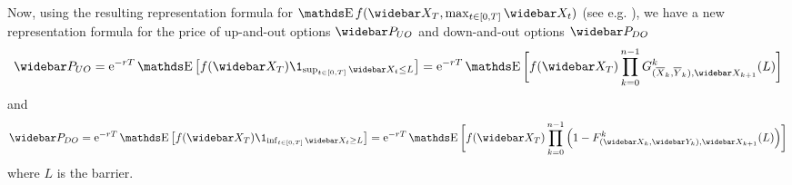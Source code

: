 Now, using the resulting representation formula for $\E f (\widebar X_T, \max_{t \in [0,T]} \widebar X_t)$ (see e.g. \cite{sagna2010pricing, pages2018numerical}), we have a new representation formula for the price of up-and-out options $\widebar P_{UO}$ and down-and-out options $\widebar P_{DO}$
\begin{equation}
	\widebar P_{UO} = \e^{-rT} \E \big[ f(\widebar X_T) \1_{\sup_{t \in [0,T]} \widebar X_t \leq L} \big] = \e^{-rT} \E \bigg[ f(\widebar X_T) \prod_{k=0}^{n-1} G_{ (\overline{X}_k, \overline{Y}_k), \widebar X_{k+1}}^k (L) \bigg]
\end{equation}
and
\begin{equation}
	\widebar P_{DO} = \e^{-rT} \E \big[ f(\widebar X_T) \1_{\inf_{t \in [0,T]} \widebar X_t \geq L} \big] = \e^{-rT} \E \bigg[ f(\widebar X_T) \prod_{k=0}^{n-1} \Big( 1 - F_{(\widebar X_k, \widebar Y_k), \widebar X_{k+1}}^k (L) \Big) \bigg]
\end{equation}
where $L$ is the barrier.

